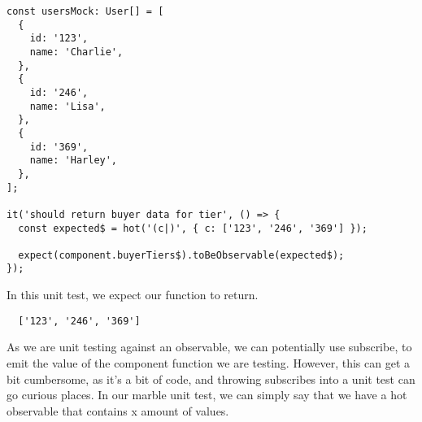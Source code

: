 \begin{lstlisting}
const usersMock: User[] = [
  {
    id: '123',
    name: 'Charlie',
  },
  {
    id: '246',
    name: 'Lisa',
  },
  {
    id: '369',
    name: 'Harley',
  },
];

it('should return buyer data for tier', () => {
  const expected$ = hot('(c|)', { c: ['123', '246', '369'] });

  expect(component.buyerTiers$).toBeObservable(expected$);
});
\end{lstlisting}

In this unit test, we expect our function to return.
\begin{verbatim}
  ['123', '246', '369']
\end{verbatim}

As we are unit testing against an observable, we can potentially use subscribe,
to emit the value of the component function we are testing. However, this can
get a bit cumbersome, as it's a bit of code, and throwing subscribes into a unit
test can go curious places. In our marble unit test, we can simply say that we
have a hot observable that contains x amount of values.
